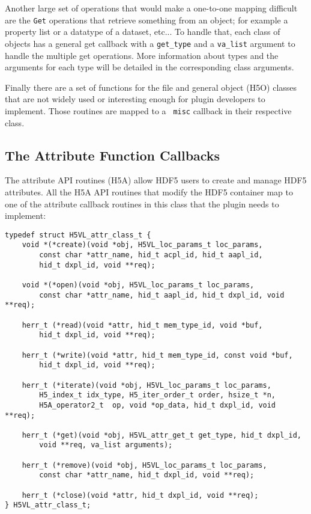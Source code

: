 Another large set of operations that would make a one-to-one mapping
difficult are the {\tt Get} operations that retrieve something from an
object; for example a property list or a datatype of a dataset,
etc... To handle that, each class of objects has a general get
callback with a {\tt get\_type} and a {\tt va\_list} argument to handle
the multiple get operations. More information about types and the
arguments for each type will be detailed in the corresponding class
arguments.

Finally there are a set of functions for the file and general object
(H5O) classes that are not widely used or interesting enough for
plugin developers to implement. Those routines are mapped to a {\tt
  misc} callback in their respective class.

\subsection{The Attribute Function Callbacks}
The attribute API routines (H5A) allow HDF5 users to create and manage
HDF5 attributes. All the H5A API routines that modify the HDF5
container map to one of the attribute callback routines in this
class that the plugin needs to implement:

\begin{lstlisting}
typedef struct H5VL_attr_class_t {
    void *(*create)(void *obj, H5VL_loc_params_t loc_params, 
        const char *attr_name, hid_t acpl_id, hid_t aapl_id, 
        hid_t dxpl_id, void **req);

    void *(*open)(void *obj, H5VL_loc_params_t loc_params, 
        const char *attr_name, hid_t aapl_id, hid_t dxpl_id, void **req);

    herr_t (*read)(void *attr, hid_t mem_type_id, void *buf, 
        hid_t dxpl_id, void **req);

    herr_t (*write)(void *attr, hid_t mem_type_id, const void *buf, 
        hid_t dxpl_id, void **req);

    herr_t (*iterate)(void *obj, H5VL_loc_params_t loc_params,
        H5_index_t idx_type, H5_iter_order_t order, hsize_t *n, 
        H5A_operator2_t  op, void *op_data, hid_t dxpl_id, void **req);

    herr_t (*get)(void *obj, H5VL_attr_get_t get_type, hid_t dxpl_id, 
        void **req, va_list arguments);

    herr_t (*remove)(void *obj, H5VL_loc_params_t loc_params, 
        const char *attr_name, hid_t dxpl_id, void **req);

    herr_t (*close)(void *attr, hid_t dxpl_id, void **req);
} H5VL_attr_class_t;
\end{lstlisting}

